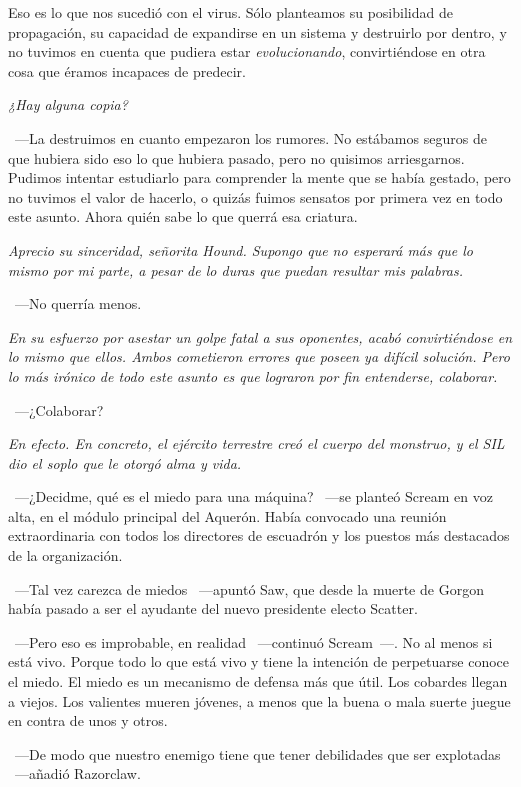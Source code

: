 \rquoti Eso es lo que nos sucedió con el virus. Sólo planteamos su posibilidad de propagación, su capacidad de expandirse en un sistema y destruirlo por dentro, y no tuvimos en cuenta que pudiera estar \emph{evolucionando}, convirtiéndose en otra cosa que éramos incapaces de predecir.

\emph{¿Hay alguna copia?}

~---La destruimos en cuanto empezaron los rumores. No estábamos seguros de que hubiera sido eso lo que hubiera pasado, pero no quisimos arriesgarnos. Pudimos intentar estudiarlo para comprender la mente que se había gestado, pero no tuvimos el valor de hacerlo, o quizás fuimos sensatos por primera vez en todo este asunto. Ahora quién sabe lo que querrá esa criatura.

\emph{Aprecio su sinceridad, señorita Hound. Supongo que no esperará más que lo mismo por mi parte, a pesar de lo duras que puedan resultar mis palabras.}

~---No querría menos.

\emph{En su esfuerzo por asestar un golpe fatal a sus oponentes, acabó convirtiéndose en lo mismo que ellos. Ambos cometieron errores que poseen ya difícil solución. Pero lo más irónico de todo este asunto es que lograron por fin entenderse, colaborar.}

~---¿Colaborar?

\emph{En efecto. En concreto, el ejército terrestre creó el cuerpo del monstruo, y el SIL dio el soplo que le otorgó alma y vida.}

\parbreak
~---¿Decidme, qué es el miedo para una máquina? ~---se planteó Scream en voz alta, en el módulo principal del Aquerón. Había convocado una reunión extraordinaria con todos los directores de escuadrón y los puestos más destacados de la organización.

~---Tal vez carezca de miedos ~---apuntó Saw, que desde la muerte de Gorgon había pasado a ser el ayudante del nuevo presidente electo Scatter.

~---Pero eso es improbable, en realidad ~---continuó Scream~---. No al menos si está vivo. Porque todo lo que está vivo y tiene la intención de perpetuarse conoce el miedo. El miedo es un mecanismo de defensa más que útil. Los cobardes llegan a viejos. Los valientes mueren jóvenes, a menos que la buena o mala suerte juegue en contra de unos y otros.

~---De modo que nuestro enemigo tiene que tener debilidades que ser explotadas ~---añadió Razorclaw.

